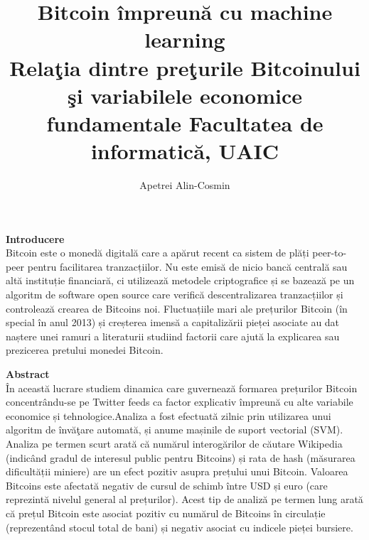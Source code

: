 \documentclass[a4paper,10pt]{article}
\title{
Bitcoin împreună cu machine learning\\
{\normalsize
Relaţia dintre preţurile Bitcoinului şi variabilele economice fundamentale
}
{\normalsize
Facultatea de informatică, UAIC
}
}
\author{Apetrei Alin-Cosmin}
\date{}
\begin{document}
\maketitle

\textbf{Introducere}\\

Bitcoin este o monedă digitală care a apărut recent ca sistem de plăți peer-to-peer pentru
facilitarea tranzacțiilor. Nu este emisă de nicio bancă centrală sau altă instituție financiară, ci utilizează
metodele criptografice și se bazează pe un algoritm de software open source care verifică descentralizarea
tranzacțiilor și controlează crearea de Bitcoins noi. Fluctuațiile mari ale prețurilor Bitcoin
(în special în anul 2013) și creșterea imensă a capitalizării pieței asociate
au dat naștere unei ramuri a literaturii studiind factorii care ajută la explicarea sau prezicerea pretului monedei Bitcoin.
\newline

\textbf{Abstract}\\

În această lucrare studiem dinamica care guvernează formarea prețurilor Bitcoin concentrându-se pe Twitter feeds
 ca factor explicativ împreună cu alte variabile economice și tehnologice.Analiza a fost efectuată zilnic prin utilizarea 
unui algoritm de învăţare automată, și anume mașinile de suport vectorial (SVM). 
Analiza pe termen scurt arată că numărul interogărilor de căutare Wikipedia (indicând gradul de
interesul public pentru Bitcoins) și rata de hash (măsurarea dificultății miniere) are un efect pozitiv asupra
prețului unui Bitcoin. Valoarea Bitcoins este afectată negativ de cursul de schimb
între USD și euro (care reprezintă nivelul general al prețurilor). Acest tip de analiză pe termen lung arată că prețul Bitcoin este asociat pozitiv cu numărul de Bitcoins în circulație (reprezentând stocul total de bani) și negativ
asociat cu indicele pieței bursiere.
\end{document}
